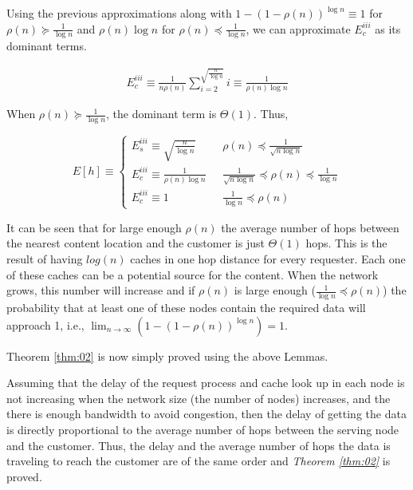 \documentclass[journal]{IEEEtran}
\theoremstyle{plain}
\theoremstyle{remark}
\begin{document}
\begin{IEEEproof}
	Using the previous approximations along with $1-(1-\rho(n))^{\log n}\equiv 1$ for $\rho(n)\succeq \frac{1}{\log n}$ and $\rho(n)\log n$ for $\rho(n)\preceq \frac{1}{\log n}$, we can approximate $E_c^{iii}$ as its dominant terms.
	
	\begin{eqnarray}
	E_c^{iii} \equiv \frac{1}{n\rho(n)}\sum_{i=2}^{\sqrt{\frac{n}{\log n}}} i \equiv \frac{1}{\rho(n)\log n} 
	\end{eqnarray}
	
	When $\rho(n)\succeq \frac{1}{\log n}$, the dominant term is $\Theta(1)$. Thus,
	
	\begin{equation}
	E[h]\equiv \left\{\begin{array}{ll}
					E_s^{iii} \equiv \sqrt{\frac{n}{\log n}}& \ \ \  \rho(n)\preceq \frac{1}{\sqrt{n\log n}} \\
					E_c^{iii}\equiv \frac{1}{\rho(n)\log n}& \ \ \  \frac{1}{\sqrt{n\log n}} \preceq \rho(n)\preceq \frac{1}{\log n} \\
					E_c^{iii}\equiv 1& \ \ \  \frac{1}{\log n} \preceq \rho(n)
			\end{array}\right . 
	\end{equation}
	
	It can be seen that for large enough $\rho(n)$ the average number of hops between the nearest content location and the customer is just $\Theta(1)$ hops. This is the result of having $log(n)$ caches in one hop distance for  every requester. Each one of these caches can be  a potential source for the content. When the network grows, this number will increase and if $\rho(n)$ is large enough ($\frac{1}{\log n} \preceq \rho(n)$) the probability that at least one of these nodes contain the required data will approach 1, i.e., $\lim_{n\rightarrow \infty}  (1-(1-\rho(n))^{\log n}) = 1$.
	
	\end{IEEEproof}
	
	Theorem \ref{thm:02} is now simply proved using the above Lemmas.

\begin{IEEEproof}
Assuming that the delay of the request process and cache look up in each node is not increasing when the network size (the number of nodes) increases, and the there is enough bandwidth to avoid congestion, then the delay of getting the data is directly proportional to the average number of hops between the serving node and the customer. Thus, the delay and the average number of hops the data is traveling to reach the customer are of the same order and \textit{Theorem \ref{thm:02}} is proved.
\end{IEEEproof}
\end{document}
